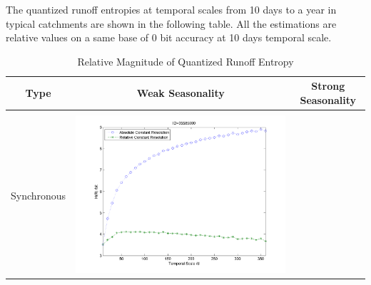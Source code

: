 \documentclass[11pt]{article}
\begin{document}
The quantized runoff entropies at temporal scales from 10 days to a year in typical catchments are shown in the following table. All the estimations are relative values on a same base of 0 bit accuracy at 10 days temporal scale. 
\begin{table}[H]\small
\caption{Relative Magnitude of Quantized Runoff Entropy}
\resizebox{\textwidth}{!}
{
\centering
\begin{tabular}{ccc}
\toprule
Type& Weak Seasonality & Strong Seasonality \\\hline
\\
Synchronous
&\begin{minipage}{.6\textwidth}\includegraphics[width=\linewidth]{resultgraph/e05585000.png}\end{minipage}


\end{tabular}}
\end{table}
\end{document}
